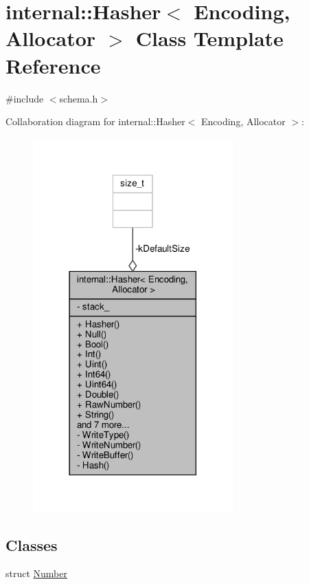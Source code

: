 \hypertarget{classinternal_1_1Hasher}{}\section{internal\+:\+:Hasher$<$ Encoding, Allocator $>$ Class Template Reference}
\label{classinternal_1_1Hasher}


{\ttfamily \#include $<$schema.\+h$>$}



Collaboration diagram for internal\+:\+:Hasher$<$ Encoding, Allocator $>$\+:
\nopagebreak
\begin{figure}[H]
\begin{center}
\leavevmode
\includegraphics[width=218pt]{classinternal_1_1Hasher__coll__graph}
\end{center}
\end{figure}
\subsection*{Classes}
\begin{DoxyCompactItemize}
\item 
struct \hyperlink{structinternal_1_1Hasher_1_1Number}{Number}
\end{DoxyCompactItemize}
